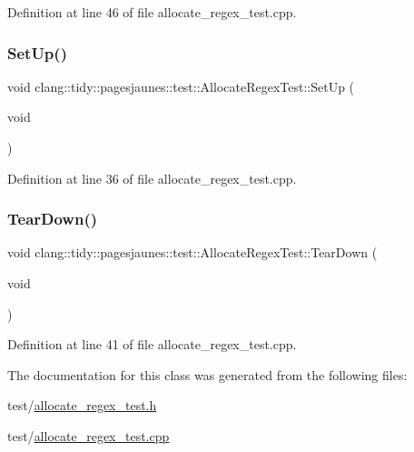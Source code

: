 Definition at line 46 of file allocate\+\_\+regex\+\_\+test.\+cpp.

\mbox{\label{classclang_1_1tidy_1_1pagesjaunes_1_1test_1_1_allocate_regex_test_ab1a41ec193c7c642096e331ba1fbcfb8}} 
\subsubsection{\texorpdfstring{Set\+Up()}{SetUp()}}
{\footnotesize\ttfamily void clang\+::tidy\+::pagesjaunes\+::test\+::\+Allocate\+Regex\+Test\+::\+Set\+Up (\begin{DoxyParamCaption}\item[{void}]{ }\end{DoxyParamCaption})\hspace{0.3cm}{\ttfamily [virtual]}}



Definition at line 36 of file allocate\+\_\+regex\+\_\+test.\+cpp.

\mbox{\label{classclang_1_1tidy_1_1pagesjaunes_1_1test_1_1_allocate_regex_test_aa6410db11e1375dc967e991b837d4370}} 
\subsubsection{\texorpdfstring{Tear\+Down()}{TearDown()}}
{\footnotesize\ttfamily void clang\+::tidy\+::pagesjaunes\+::test\+::\+Allocate\+Regex\+Test\+::\+Tear\+Down (\begin{DoxyParamCaption}\item[{void}]{ }\end{DoxyParamCaption})\hspace{0.3cm}{\ttfamily [virtual]}}



Definition at line 41 of file allocate\+\_\+regex\+\_\+test.\+cpp.



The documentation for this class was generated from the following files\+:\begin{DoxyCompactItemize}
\item 
test/\hyperlink{allocate__regex__test_8h}{allocate\+\_\+regex\+\_\+test.\+h}\item 
test/\hyperlink{allocate__regex__test_8cpp}{allocate\+\_\+regex\+\_\+test.\+cpp}\end{DoxyCompactItemize}
